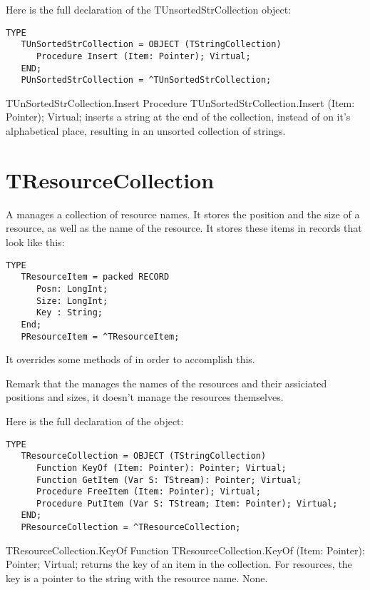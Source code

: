 Here is the full declaration of the {TUnsortedStrCollection} object:
\begin{verbatim}
TYPE
   TUnSortedStrCollection = OBJECT (TStringCollection)
      Procedure Insert (Item: Pointer); Virtual;
   END;
   PUnSortedStrCollection = ^TUnSortedStrCollection;
\end{verbatim}

\begin{procedure}{TUnSortedStrCollection.Insert}
\Declaration
Procedure TUnSortedStrCollection.Insert (Item: Pointer); Virtual;
\Description
{} inserts a string at the end of the collection, instead
of on it's alphabetical place, resulting in an unsorted collection of
strings. 
\Errors
\SeeAlso
\end{procedure}

\section{TResourceCollection}
\label{se:TResourceCollection}

A  manages a collection of resource names. 
It stores the position and the size of a resource, as well as the name of
the resource. It stores these items in records that look like this:
\begin{verbatim}
TYPE
   TResourceItem = packed RECORD
      Posn: LongInt;
      Size: LongInt;
      Key : String;
   End;
   PResourceItem = ^TResourceItem;
\end{verbatim}

It overrides some methods of  in order to accomplish
this. 

Remark that the  manages the names of the
resources and their assiciated positions and sizes, it doesn't manage
the resources themselves.

Here is the full declaration of the  object:
\begin{verbatim}
TYPE
   TResourceCollection = OBJECT (TStringCollection)
      Function KeyOf (Item: Pointer): Pointer; Virtual;
      Function GetItem (Var S: TStream): Pointer; Virtual;
      Procedure FreeItem (Item: Pointer); Virtual;
      Procedure PutItem (Var S: TStream; Item: Pointer); Virtual;
   END;
   PResourceCollection = ^TResourceCollection;
\end{verbatim}

\begin{function}{TResourceCollection.KeyOf}
\Declaration
Function TResourceCollection.KeyOf (Item: Pointer): Pointer; Virtual;
\Description
{} returns the key of an item in the collection. For resources, the
key is a pointer to the string with the resource name.
\Errors
None.
\SeeAlso
{}
\end{function}

